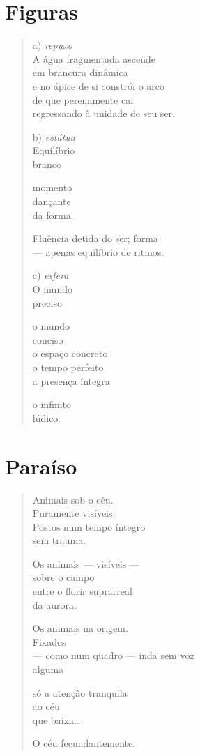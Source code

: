 \chapter{Figuras}

\begin{verse}
a) \emph{repuxo}\\
\quad A água fragmentada ascende\\
\quad em brancura dinâmica\\
\quad e no ápice de si constrói o arco\\
\quad de que perenamente cai\\
\quad regressando à unidade de seu ser.

b) \emph{estátua}\\
\quad Equilíbrio\\
\quad branco

\quad momento\\
\quad dançante\\
\quad da forma.

\quad Fluência detida do ser; forma\\
\quad --- apenas equilíbrio de ritmos.

c) \emph{esfera}\\
\quad O mundo\\
\quad preciso

\quad o mundo\\
\quad conciso\\
\quad o espaço concreto\\
\quad o tempo perfeito\\
\quad a presença íntegra

\quad o infinito\\
\quad lúdico.
\end{verse}

\chapter{Paraíso}

\begin{verse}
Animais sob o céu.\\
Puramente visíveis.\\
Postos num tempo íntegro\\
\qquad\qquad\quad sem trauma.

Os animais --- visíveis ---\\
sobre o campo\\
entre o florir suprarreal\\
\qquad\qquad\quad da aurora.

Os animais na origem.\\
Fixados\\
--- como num quadro --- inda sem voz\\
\qquad\qquad\qquad\qquad\qquad\qquad alguma

só a atenção tranquila\\
ao céu\\
que baixa\ldots{}

O céu fecundantemente.
\end{verse}

